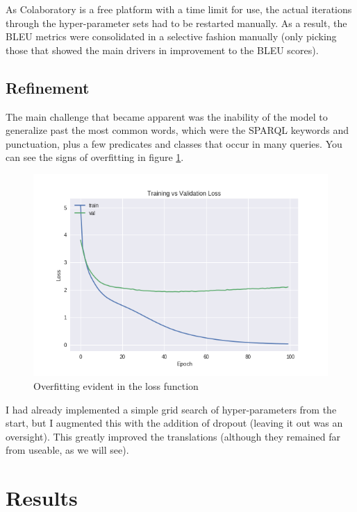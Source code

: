 \documentclass[12pt]{article}
\begin{document}
As Colaboratory is a free platform with a time limit for use, the actual iterations
through the hyper-parameter sets had to be restarted manually. As a result, the 
BLEU metrics were consolidated in a selective fashion manually (only picking those
that showed the main drivers in improvement to the BLEU scores).

\subsection{Refinement}\label{refinement}

The main challenge that became apparent was the inability of the model
to generalize past the most common words, which were the SPARQL keywords
and punctuation, plus a few predicates and classes that occur in many
queries. You can see the signs of overfitting in figure \ref{fig:loss-metric-shows-overfitting}.

\begin{figure}
  \centering
  \includegraphics[width=12cm]{images/loss_model_256_100_64_adam_00_00.png}
  \caption{Overfitting evident in the loss function}
  \label{fig:loss-metric-shows-overfitting}
\end{figure}

I had already implemented a simple grid search of hyper-parameters from the start,
but I augmented this with the addition of dropout (leaving it out was an oversight).
This greatly improved the translations (although they remained far from useable,
as we will see). 

\section{Results}\label{iv.-results}
\end{document}
